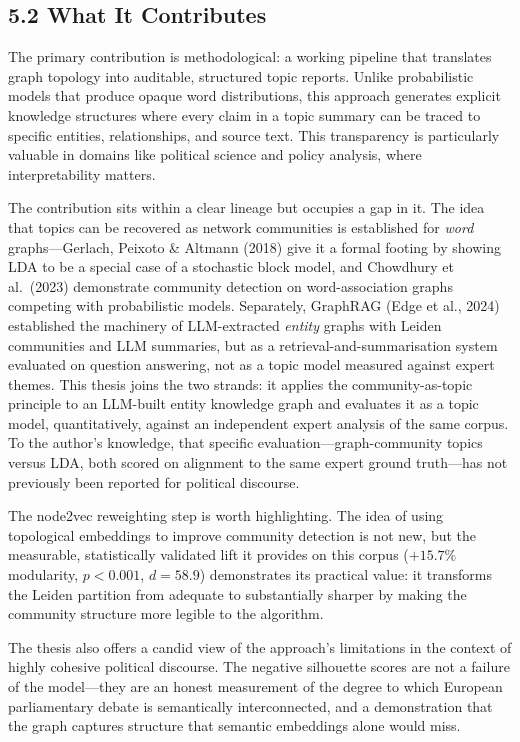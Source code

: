 \documentclass[11pt]{article}
\begin{document}
\subsection{5.2 What It Contributes}

The primary contribution is methodological: a working pipeline that translates graph topology into auditable, structured topic reports. Unlike probabilistic models that produce opaque word distributions, this approach generates explicit knowledge structures where every claim in a topic summary can be traced to specific entities, relationships, and source text. This transparency is particularly valuable in domains like political science and policy analysis, where interpretability matters.

The contribution sits within a clear lineage but occupies a gap in it. The idea that topics can be recovered as network communities is established for \emph{word} graphs---Gerlach, Peixoto \& Altmann (2018) give it a formal footing by showing LDA to be a special case of a stochastic block model, and Chowdhury et al.\ (2023) demonstrate community detection on word-association graphs competing with probabilistic models. Separately, GraphRAG (Edge et al., 2024) established the machinery of LLM-extracted \emph{entity} graphs with Leiden communities and LLM summaries, but as a retrieval-and-summarisation system evaluated on question answering, not as a topic model measured against expert themes. This thesis joins the two strands: it applies the community-as-topic principle to an LLM-built entity knowledge graph and evaluates it as a topic model, quantitatively, against an independent expert analysis of the same corpus. To the author's knowledge, that specific evaluation---graph-community topics versus LDA, both scored on alignment to the same expert ground truth---has not previously been reported for political discourse.

The node2vec reweighting step is worth highlighting. The idea of using topological embeddings to improve community detection is not new, but the measurable, statistically validated lift it provides on this corpus ($+15.7\%$ modularity, $p<0.001$, $d=58.9$) demonstrates its practical value: it transforms the Leiden partition from adequate to substantially sharper by making the community structure more legible to the algorithm.

The thesis also offers a candid view of the approach's limitations in the context of highly cohesive political discourse. The negative silhouette scores are not a failure of the model---they are an honest measurement of the degree to which European parliamentary debate is semantically interconnected, and a demonstration that the graph captures structure that semantic embeddings alone would miss.
\end{document}
